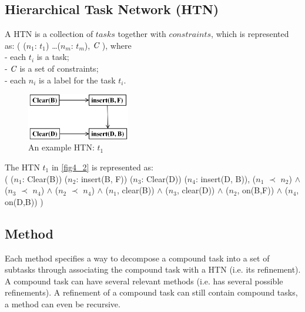 \subsection{Hierarchical Task Network (HTN)}
A HTN is a collection of $tasks$ together with $constraints$, which is represented as: ( ($n_1$: $t_1$) \ldots ($n_m$: $t_m$), $\emph{C}$ ), where\\
- each $t_i$ is a task;\\
- $\emph{C}$ is a set of constraints;\\
- each $n_i$ is a label for the task $t_i$.

\begin{figure}[H]
    \center
    \includegraphics[width=0.4\textwidth]{./images/4_2.png}
    \caption{An example HTN: $t_1$}
    \label{fig4_2}
\end{figure}

The HTN $t_1$ in \autoref{fig4_2} is represented as:\\[0.2cm]
( ($n_1$: Clear(B)) ($n_2$: insert(B, F)) ($n_3$: Clear(D)) ($n_4$: insert(D, B)),  ($n_1$ $\prec$ $n_2$) $\wedge$ ($n_3$ $\prec$ $n_4$) $\wedge$ ($n_2$ $\prec$ $n_4$) $\wedge$ ($n_1$, clear(B)) $\wedge$ ($n_3$, clear(D)) $\wedge$ ($n_2$, on(B,F)) $\wedge$ ($n_4$, on(D,B)) )




\subsection{Method}
Each method specifies a way to decompose a compound task into a set of subtasks through associating the compound task with a HTN (i.e. its refinement). A compound task can have several relevant methods (i.e. has several possible refinements). A refinement of a compound task can still contain compound tasks, a method can even be recursive.

